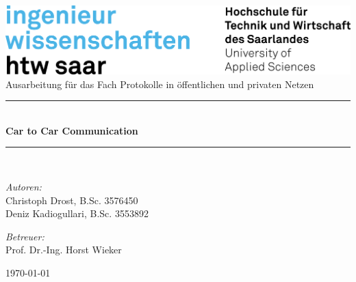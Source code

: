 \documentclass[12pt, a4paper, twoside, openright,ngerman, bibtotoc, toc=listof]{scrreprt}
\begin{document}
\begin{titlepage}
		\begin{center}
			\includegraphics[width=.8\linewidth]{content/images/logos/logo_htw.png}\\[1cm]   
			
			\vspace{10 mm}
			Ausarbeitung für das Fach \glqq Protokolle in öffentlichen und privaten Netzen\grqq 
			\vspace{10 mm}	
			
			\newcommand{\HRule}{\rule{\linewidth}{0.5mm}} \HRule \\[0.4cm] { \huge \bfseries Car to Car Communication}\\[0.4cm]
			\HRule \\[1.5cm]

			\begin{minipage}{0.4\textwidth}
				\begin{flushleft} \large
					\emph{Autoren:}\\
					Christoph Drost, B.Sc. 3576450\\
					Deniz Kadiogullari, B.Sc. 3553892\\
				\end{flushleft}
			\end{minipage}
			\hfill
			\begin{minipage}{0.4\textwidth}
				\begin{flushright} \large
					\emph{Betreuer:} \\
					Prof. Dr.-Ing. Horst Wieker
				\end{flushright}
			\end{minipage}
			\vfill
			{\large \today}
		\end{center}
	\end{titlepage}



\cleardoublepage
\tableofcontents
 
\end{document}
